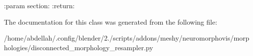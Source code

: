 \begin{DoxyVerb}:param section:
:return:
\end{DoxyVerb}
 

The documentation for this class was generated from the following file\+:\begin{DoxyCompactItemize}
\item 
/home/abdellah/.\+config/blender/2./scripts/addons/meshy/neuromorphovis/morphologies/disconnected\+\_\+morphology\+\_\+resampler.\+py\end{DoxyCompactItemize}
